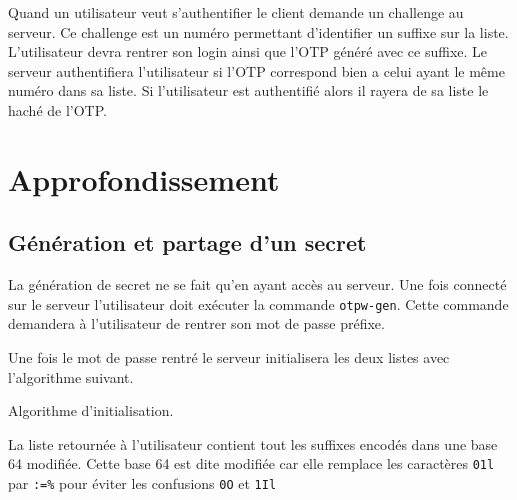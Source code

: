 \documentclass{../res/univ-projet}
\begin{document}
        Quand un utilisateur veut s'authentifier le client demande un challenge 
    au serveur. Ce challenge est un numéro permettant d'identifier un suffixe sur
    la liste. L'utilisateur devra rentrer son login ainsi que l'OTP généré avec
    ce suffixe. Le serveur authentifiera l'utilisateur si l'OTP correspond bien a celui ayant le même numéro
    dans sa liste. Si l'utilisateur est authentifié
    alors il rayera de sa liste le haché de l'OTP.

\section{Approfondissement}
\subsection{Génération et partage d'un secret}
        La génération de secret ne se fait qu'en ayant accès au serveur. Une fois
    connecté sur le serveur l'utilisateur doit exécuter la commande \verb?otpw-gen?.
    Cette commande demandera à l'utilisateur de rentrer son mot de passe préfixe.

        Une fois le mot de passe rentré le serveur initialisera les deux listes avec 
    l'algorithme suivant.
    \begin{algorithm}
        \begin{algorithmic}
            \ENDFOR
        \end{algorithmic}
        \caption{Algorithme d'initialisation.}
        \label{gen}
    \end{algorithm}
    
        La liste retournée à l'utilisateur contient tout les suffixes encodés dans une
    base 64 modifiée. Cette base 64 est dite modifiée car elle remplace les caractères
     \verb?01l? par \verb?:=%? pour éviter les confusions \verb?0O? et \verb?1Il?
\end{document}
